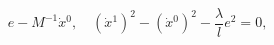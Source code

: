 \begin{equation}
e-M^{-1}\dot{x}{}^0,\quad
(\dot{x}{}^1)^2-(\dot{x}{}^0)^2-\frac{\lambda}{l}e^2=0,
\label{elam}
\end{equation}

